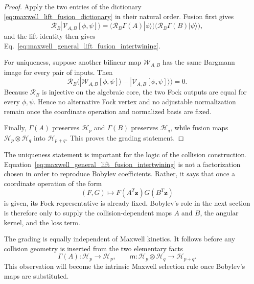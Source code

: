 \documentclass[11pt,oneside]{article}
\numberwithin{equation}{section}
\theoremstyle{definition}
\begin{document}
\begin{proof}
Apply the two entries of the dictionary \eqref{eq:maxwell_lift_fusion_dictionary} in their natural order.  Fusion first gives
\begin{equation}
\mathcal R_B|\mathcal V_{A,B}[\phi,\psi]\rangle
=
\bigl(\mathcal R_B\Gamma(A)|\phi\rangle\bigr)
\bigl(\mathcal R_B\Gamma(B)|\psi\rangle\bigr),
\end{equation}
and the lift identity then gives Eq.~\eqref{eq:maxwell_general_lift_fusion_intertwining}.

For uniqueness, suppose another bilinear map $\mathcal W_{A,B}$ has the same Bargmann image for every pair of inputs.  Then
\begin{equation}
\mathcal R_B\Big(
|\mathcal W_{A,B}[\phi,\psi]\rangle
-|\mathcal V_{A,B}[\phi,\psi]\rangle
\Big)=0.
\end{equation}
Because $\mathcal R_B$ is injective on the algebraic core, the two Fock outputs are equal for every $\phi,\psi$.  Hence no alternative Fock vertex and no adjustable normalization remain once the coordinate operation and normalized basis are fixed.

Finally, $\Gamma(A)$ preserves $\mathscr H_p$ and $\Gamma(B)$ preserves $\mathscr H_q$, while fusion maps $\mathscr H_p\otimes\mathscr H_q$ into $\mathscr H_{p+q}$.  This proves the grading statement.
\end{proof}

The uniqueness statement is important for the logic of the collision construction.  Equation~\eqref{eq:maxwell_general_lift_fusion_intertwining} is not a factorization chosen in order to reproduce Bobylev coefficients.  Rather, it says that once a coordinate operation of the form
\begin{equation}
(F,G)\longmapsto F(A^T\bm z)G(B^T\bm z)
\label{eq:maxwell_generic_substitution_product}
\end{equation}
is given, its Fock representative is already fixed.  Bobylev's role in the next section is therefore only to supply the collision-dependent maps $A$ and $B$, the angular kernel, and the loss term.

The grading is equally independent of Maxwell kinetics.  It follows before any collision geometry is inserted from the two elementary facts
\begin{equation}
\Gamma(A):\mathscr H_p\to\mathscr H_p,
\qquad
\mathsf m:\mathscr H_p\otimes\mathscr H_q\to\mathscr H_{p+q}.
\end{equation}
This observation will become the intrinsic Maxwell selection rule once Bobylev's maps are substituted.
\end{document}
